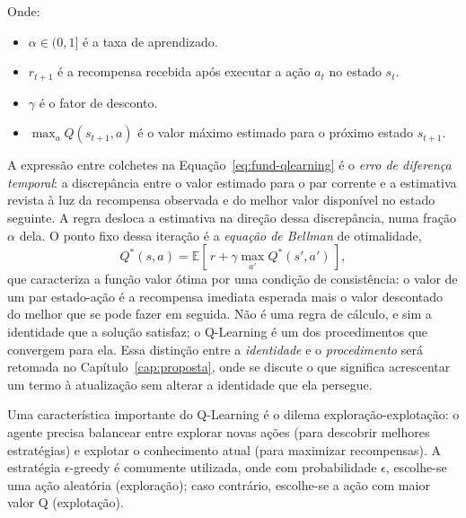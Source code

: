 Onde:
\begin{itemize}
    \item $\alpha \in (0, 1]$ é a taxa de aprendizado.
    \item $r_{t+1}$ é a recompensa recebida após executar a ação $a_t$ no estado $s_t$.
    \item $\gamma$ é o fator de desconto.
    \item $\max_{a} Q(s_{t+1}, a)$ é o valor máximo estimado para o próximo estado $s_{t+1}$.
\end{itemize}

A expressão entre colchetes na Equação~\eqref{eq:fund-qlearning} é o \emph{erro de
diferença temporal}: a discrepância entre o valor estimado para o par corrente e a
estimativa revista à luz da recompensa observada e do melhor valor disponível no estado
seguinte. A regra desloca a estimativa na direção dessa discrepância, numa fração
$\alpha$ dela. O ponto fixo dessa iteração é a \emph{equação de Bellman} de otimalidade,
\begin{equation}
Q^*(s,a) = \mathbb{E}\!\left[\, r + \gamma \max_{a'} Q^*(s',a') \,\right],
\label{eq:fund-bellman}
\end{equation}
que caracteriza a função valor ótima por uma condição de consistência: o valor de um par
estado-ação é a recompensa imediata esperada mais o valor descontado do melhor que se pode
fazer em seguida. Não é uma regra de cálculo, e sim a identidade que a solução satisfaz; o
Q-Learning é um dos procedimentos que convergem para ela. Essa distinção entre a
\emph{identidade} e o \emph{procedimento} será retomada no
Capítulo~\ref{cap:proposta}, onde se discute o que significa acrescentar um termo à
atualização sem alterar a identidade que ela persegue.

Uma característica importante do Q-Learning é o dilema exploração-explotação: o agente precisa balancear entre explorar novas ações (para descobrir melhores estratégias) e explotar o conhecimento atual (para maximizar recompensas). A estratégia $\epsilon$-greedy é comumente utilizada, onde com probabilidade $\epsilon$, escolhe-se uma ação aleatória (exploração); caso contrário, escolhe-se a ação com maior valor Q (explotação).

